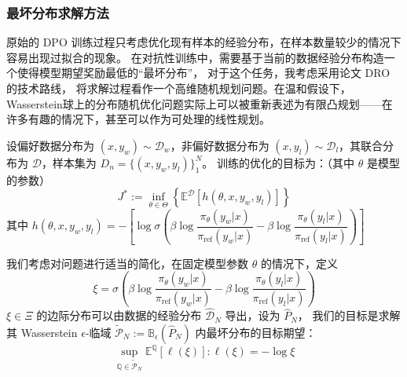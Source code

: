 \subsubsection{最坏分布求解方法} \label{sec:bad-dis}

原始的 DPO 训练过程只考虑优化现有样本的经验分布，在样本数量较少的情况下容易出现过拟合的现象。
在对抗性训练中，需要基于当前的数据经验分布构造一个使得模型期望奖励最低的“最坏分布”，
对于这个任务，我考虑采用论文 DRO\citep{Esfahani2018Data} 的技术路线，
将求解过程看作一个高维随机规划问题。在温和假设下，Wasserstein球上的分布随机优化问题实际上可以被重新表述为有限凸规划——在许多有趣的情况下，甚至可以作为可处理的线性规划。

设偏好数据分布为 $(x, y_w) \sim \mathcal{D}_w$，非偏好数据分布为 $(x, y_l) \sim \mathcal{D}_l$，其联合分布为 $\mathcal{D}$，样本集为 $D_n = \{(x, y_w, y_l)\}_1^N$。
训练的优化的目标为：（其中 $\theta$ 是模型的参数）
\begin{equation}
    J^* := \inf_{\theta \in \Theta} \left\{ \mathbb{E}^{\mathcal{D}} [h(\theta, x,y_w,y_l)]\right\}
\end{equation}
其中 $h(\theta, x, y_w, y_l) = - \left[ \log \sigma \left( \beta \log \dfrac{\pi_{\theta}(y_w | x)}{\pi_{\text{ref}} (y_w |x)} -  \beta \log \dfrac{\pi_{\theta}(y_l | x)}{\pi_{\text{ref}} (y_l |x)} \right)\right]$  

我们考虑对问题进行适当的简化，在固定模型参数 $\theta$ 的情况下，定义
\begin{equation}
    \xi = \sigma \left( \beta \log \dfrac{\pi_{\theta}(y_w | x)}{\pi_{\text{ref}} (y_w |x)} -  \beta \log \dfrac{\pi_{\theta}(y_l | x)}{\pi_{\text{ref}} (y_l |x)} \right)
\end{equation}
$\xi \in \Xi$ 的边际分布可以由数据的经验分布 $\hat{\mathcal{D}}_N$ 导出，设为 $\hat{P}_N$，
我们的目标是求解其 Wasserstein $\epsilon$-临域 $\tilde{\mathcal{P}}_N := \mathbb{B}_{\epsilon}(\hat{P}_N)$ 内最坏分布的目标期望：
\begin{equation}
    \sup_{\mathbb{Q} \in \tilde{\mathcal{\mathcal{P}}}_N} \mathbb{E}^{\mathbb{Q}} [\ell (\xi)] : \ell(\xi) = - \log \xi
\end{equation}

